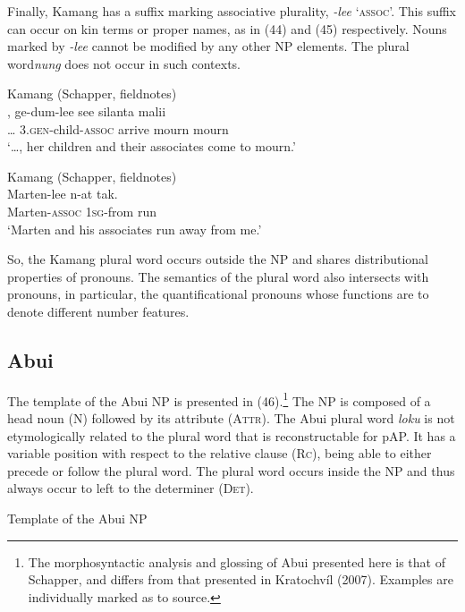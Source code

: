 Finally, Kamang has a suffix marking associative plurality, \textit{-lee} `\textsc{assoc}'. This suffix can occur on kin terms or proper names, as in (44) and (45) respectively. Nouns marked by \textit{-lee} cannot be modified by any other NP elements. The plural word\textit{nung} does not occur in such contexts.


\ea%
\label{ex:44}
Kamang (Schapper, fieldnotes)\\
\gll  {\dots},   ge-dum-lee see silanta malii \\
  {\dots} 3.\textsc{gen}-child-\textsc{assoc} arrive mourn mourn \\
\glt `{\dots}, her children and their associates come to mourn.'
\z







\ea%
\label{ex:45}
Kamang (Schapper, fieldnotes)\\
\gll  Marten-lee n-at tak.  \\
  Marten-\textsc{assoc} 1\textsc{sg}-from run   \\
\glt `Marten and his associates run away from me.'
\z






So, the Kamang plural word occurs outside the NP and shares distributional properties of pronouns. The semantics of the plural word also intersects with pronouns, in particular, the quantificational pronouns whose functions are to denote different number features.

\subsection{Abui} %
The template of the Abui NP is presented in (46).\footnote{  The morphosyntactic analysis and glossing of Abui presented here is that of Schapper, and differs from that presented in Kratochv\'il (2007). Examples are individually marked as to source.} The NP is composed of a head noun (N) followed by its attribute (\textsc{Attr).} The Abui plural word \textit{loku} is not etymologically related to the plural word that is reconstructable for pAP. It has a variable position with respect to the relative clause (\textsc{Rc}), being able to either precede or follow the plural word. The plural word occurs inside the NP and thus always occur to left to the determiner (\textsc{Det).}

\ea%
\label{ex:46}

 Template of the Abui NP

